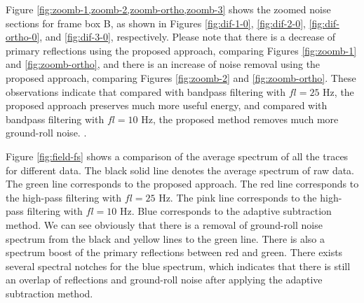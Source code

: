 Figure \ref{fig:zoomb-1,zoomb-2,zoomb-ortho,zoomb-3} shows the zoomed noise sections for frame box B, as shown in Figures \ref{fig:dif-1-0}, \ref{fig:dif-2-0},  \ref{fig:dif-ortho-0}, and \ref{fig:dif-3-0}, respectively. Please note that there is a decrease of primary reflections using the proposed approach, comparing Figures \ref{fig:zoomb-1} and \ref{fig:zoomb-ortho}, and there is an increase of noise removal using the proposed approach, comparing Figures \ref{fig:zoomb-2} and \ref{fig:zoomb-ortho}.  These observations indicate that compared with bandpass filtering with $fl=25$ Hz, the proposed approach preserves much more useful energy, and compared with bandpass filtering with $fl=10$ Hz, the proposed method removes much more ground-roll noise. .

Figure \ref{fig:field-fs} shows a comparison of the average spectrum of all the traces for different data. The black solid line denotes the average spectrum of raw data. The green line corresponds to the proposed approach. The red line corresponds to the high-pass filtering with $fl=25$ Hz. The pink line corresponds to the high-pass filtering with $fl=10$ Hz. Blue corresponds to the adaptive subtraction method. We can see obviously that there is a removal of ground-roll noise spectrum from the black and yellow lines to the green line.  There is also a spectrum boost of the primary reflections between red and green. There exists several spectral notches for the blue spectrum, which indicates that there is still an overlap of reflections and ground-roll noise after applying the adaptive subtraction method.





